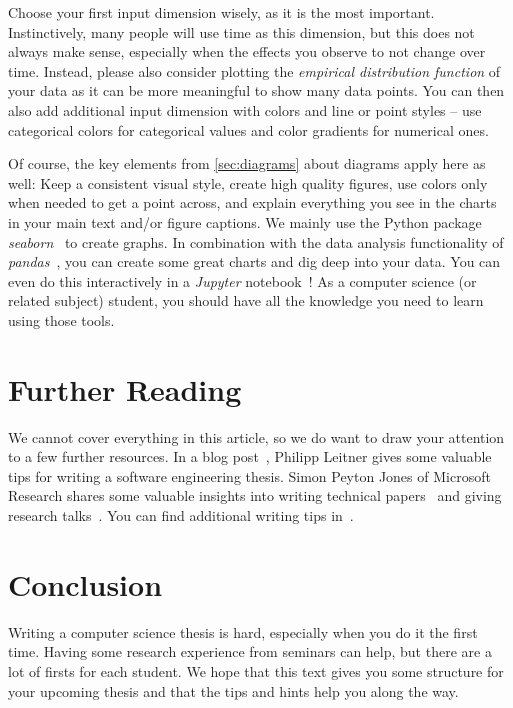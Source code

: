 \documentclass[a4paper]{article}
\begin{document}
Choose your first input dimension wisely, as it is the most important.
Instinctively, many people will use time as this dimension, but this does not always make sense, especially when the effects you observe to not change over time.
Instead, please also consider plotting the \emph{empirical distribution function} of your data as it can be more meaningful to show many data points.
You can then also add additional input dimension with colors and line or point styles -- use categorical colors for categorical values and color gradients for numerical ones.

Of course, the key elements from \cref{sec:diagrams} about diagrams apply here as well:
Keep a consistent visual style, create high quality figures, use colors only when needed to get a point across, and explain everything you see in the charts in your main text and/or figure captions.
We mainly use the Python package \emph{seaborn}~\cite{seaborn} to create graphs.
In combination with the data analysis functionality of \emph{pandas}~\cite{pandas}, you can create some great charts and dig deep into your data.
You can even do this interactively in a \emph{Jupyter} notebook~\cite{jupyter}!
As a computer science (or related subject) student, you should have all the knowledge you need to learn using those tools.

\section{Further Reading}
\label{sec:resources}

We cannot cover everything in this article, so we do want to draw your attention to a few further resources.
In a blog post~\cite{leitner}, Philipp Leitner gives some valuable tips for writing a software engineering thesis.
Simon Peyton Jones of Microsoft Research shares some valuable insights into writing technical papers~\cite{jones-paper} and giving research talks~\cite{jones-talk}.
You can find additional writing tips in~\cite{patterson-writing,ernst-writing,schulzrinne-writing}.

\section{Conclusion}
\label{sec:conclusion}

Writing a computer science thesis is hard, especially when you do it the first time.
Having some research experience from seminars can help, but there are a lot of firsts for each student.
We hope that this text gives you some structure for your upcoming thesis and that the tips and hints help you along the way.

\printbibliography
\end{document}
